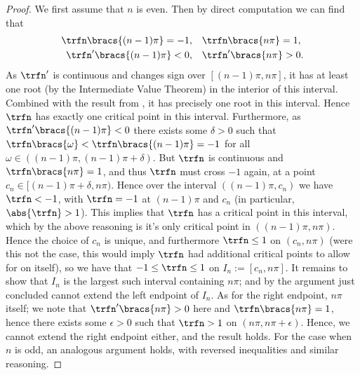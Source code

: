 \begin{proof}
	We first assume that $n$ is even.
	Then by direct computation we can find that
	\begin{align*}
		\trfn\bracs{(n-1)\pi} = -1, &\quad \trfn\bracs{n\pi} = 1, \\
		\trfn^{\prime}\bracs{(n-1)\pi} <0, &\quad \trfn^{\prime}\bracs{n\pi} >0.
	\end{align*}
	As $\trfn^{\prime}$ is continuous and changes sign over $[(n-1)\pi, n\pi]$, it has at least one root (by the Intermediate Value Theorem) in the interior of this interval.
	Combined with the result from , it has precisely one root in this interval.
	Hence $\trfn$ has exactly one critical point in this interval.
	Furthermore, as $\trfn^{\prime}\bracs{(n-1)\pi}<0$ there exists some $\delta>0$ such that $\trfn\bracs{\omega}<\trfn\bracs{(n-1)\pi}=-1$ for all $\omega\in((n-1)\pi, (n-1)\pi+\delta)$.
	But $\trfn$ is continuous and $\trfn\bracs{n\pi}=1$, and thus $\trfn$ must cross $-1$ again, at a point $c_{n}\in[(n-1)\pi+\delta, n\pi)$.
	Hence over the interval $((n-1)\pi,c_{n})$ we have $\trfn<-1$, with $\trfn=-1$ at $(n-1)\pi$ and $c_{n}$ (in particular, $\abs{\trfn}>1$).
	This implies that $\trfn$ has a critical point in this interval, which by the above reasoning is it's only critical point in $((n-1)\pi, n\pi)$.
	Hence the choice of $c_{n}$ is unique, and furthermore $\trfn\leq1$ on $(c_{n},n\pi)$ (were this not the case, this would imply $\trfn$ had additional critical points to allow for  on itself), so we have that $-1\leq\trfn\leq1$ on $I_{n}:=[c_{n}, n\pi]$.
	It remains to show that $I_{n}$ is the largest such interval containing $n\pi$; and by the argument just concluded cannot extend the left endpoint of $I_{n}$.
	As for the right endpoint, $n\pi$ itself; we note that $\trfn^{\prime}\bracs{n\pi}>0$ here and $\trfn\bracs{n\pi} = 1$, hence there exists some $\epsilon>0$ such that $\trfn>1$ on $(n\pi, n\pi+\epsilon)$.
	Hence, we cannot extend the right endpoint either, and the result holds. \newline
	For the case when $n$ is odd, an analogous argument holds, with reversed inequalities and similar reasoning.
\end{proof}

